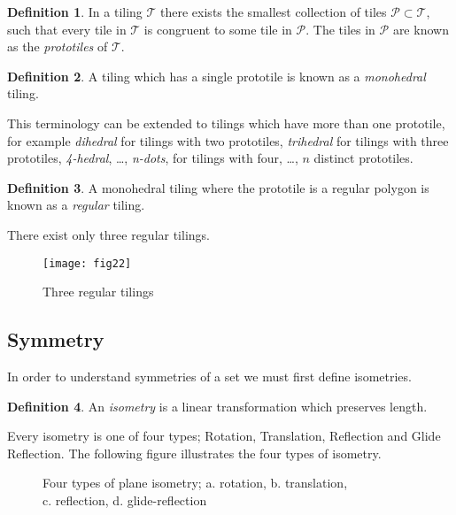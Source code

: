 \documentclass[a4paper,12pt,twoside,abstraction,titlepage]{article}
\theoremstyle{remark}
\theoremstyle{definition}
\newtheorem{definition}{Definition}[section]
\begin{document}
\begin{definition}
In a tiling $\mathscr{T}$ there exists the smallest collection of tiles $\mathscr{P} \subset \mathscr{T}$, such that every tile in $\mathscr{T}$ is congruent to some tile in $\mathscr{P}$.  The tiles in $\mathscr{P}$ are known as the \emph{prototiles} of $\mathscr{T}$.~\cite[\S 1.1]{scienceu, branko}
\end{definition}

\begin{definition}
A tiling which has a single prototile is known as a \emph{monohedral} tiling.~\cite[\S 1.2]{branko}
\end{definition}

\noindent This terminology can be extended to tilings which have more than one prototile, for example \emph{dihedral} for tilings with two prototiles, \emph{trihedral} for tilings with three prototiles, \emph{4-hedral}, \ldots, \emph{n-dots}, for tilings with four, \ldots, $n$ distinct prototiles.

\begin{definition}
A monohedral tiling where the prototile is a regular polygon is known as a \emph{regular} tiling.~\cite[\S 1.2]{branko}
\end{definition}

\noindent There exist only three regular tilings.

\begin{figure}[h]
\begin{center}
\texttt{[image: fig22]}
\caption{Three regular tilings\label{regular}~\cite{cornell}}
\vspace{-20pt}
\end{center}
\end{figure}


\subsection{Symmetry}
In order to understand symmetries of a set we must first define isometries.
\begin{definition}
An \emph{isometry} is a linear transformation which preserves length.~\cite{wolfram}
\end{definition}

\noindent Every isometry is one of four types; Rotation, Translation, Reflection and Glide Reflection. The following figure illustrates the four types of isometry.

\begin{figure}[h]
\makebox[\textwidth]{\framebox[6cm]{\rule{0pt}{7cm}}}
\caption[Four types of plane isometry{~\cite[\S 1.3]{branko}}]{Four types of plane isometry; a. rotation, b. translation, \\c. reflection, d. glide-reflection~\cite[p26]{branko}}
\end{figure}
\end{document}
